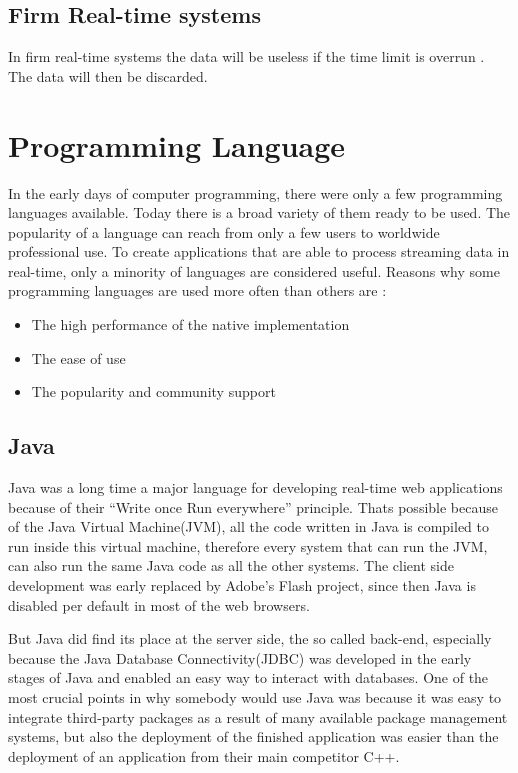 \subsection{Firm Real-time systems}

In firm real-time systems the data will be useless if the time limit is overrun \autocite{RealTimeHermannKopetz}. The data will then be discarded.

\author{Nico Leidenfrost}
%
\section{Programming Language}
In the early days of computer programming, there were only a few programming languages available. Today there is a broad variety of them ready to be used. The popularity of a language can reach from only a few users to worldwide professional use. To create applications that are able to process streaming data in real-time, only a minority of languages are considered useful. Reasons why some programming languages are used more often than others are \autocite{RealTimeByronEllis}:

\begin{itemize}
    \item The high performance of the native implementation
    \item The ease of use
    \item The popularity and community support
\end{itemize}

\subsection{Java}
Java was a long time a major language for developing real-time web applications because of their ``Write once Run everywhere'' principle. Thats possible because of the Java Virtual Machine(JVM), all the code written in Java is compiled to run inside this virtual machine, therefore every system that can run the JVM, can also run the same Java code as all the other systems. The client side development was early replaced by Adobe's Flash project, since then Java is disabled per default in most of the web browsers.

But Java did find its place at the server side, the so called back-end, especially because the Java Database Connectivity(JDBC) was developed in the early stages of Java and enabled an easy way to interact with databases. One of the most crucial points in why somebody would use Java was because it was easy to integrate third-party packages as a result of many available package management systems, but also the deployment of the finished application was easier than the deployment of an application from their main competitor C++.

